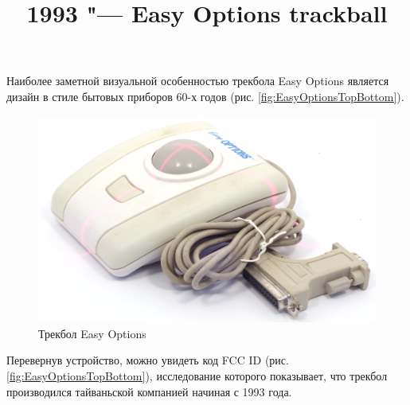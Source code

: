 \documentclass[11pt, a4paper]{article}
\begin{document}
\title{1993 "--- Easy Options trackball}
\date{}
\maketitle

Наиболее заметной визуальной особенностью трекбола Easy Options является дизайн в стиле бытовых приборов 60-х годов (рис. \ref{fig:EasyOptionsTopBottom}).

\begin{figure}[h]
    \centering
    \includegraphics[scale=0.5]{1993_easy_options_trackball/pic_60.jpg}
    \caption{Трекбол Easy Options}
    \label{fig:EasyOptionsSize}
\end{figure}

Перевернув устройство, можно увидеть код FCC ID (рис. \ref{fig:EasyOptionsTopBottom}), исследование которого показывает, что трекбол производился тайваньской компанией начиная с 1993 года.
\end{document}

